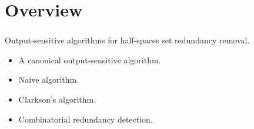 \section{Overview}
\begin{frame}\frametitle{\insertsection}\justifying
Output-sensitive algorithms for half-spaces set redundancy removal.
\begin{itemize}[label={\color{prussianblue}$\bullet$},itemsep=6pt]
\item A canonical output-sensitive algorithm.\pause
\item Naive algorithm.\pause
\item Clarkson's algorithm.\pause
\item Combinatorial redundancy detection.\pause
\end{itemize}
\end{frame}
